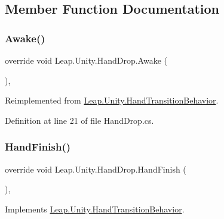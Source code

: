 \subsection{Member Function Documentation}
\mbox{\label{class_leap_1_1_unity_1_1_hand_drop_abda506fc6c05f924aa38e0011e26ffb9}} 
\subsubsection{\texorpdfstring{Awake()}{Awake()}}
{\footnotesize\ttfamily override void Leap.\+Unity.\+Hand\+Drop.\+Awake (\begin{DoxyParamCaption}{ }\end{DoxyParamCaption})\hspace{0.3cm}{\ttfamily [protected]}, {\ttfamily [virtual]}}



Reimplemented from \mbox{\hyperlink{class_leap_1_1_unity_1_1_hand_transition_behavior_ab9676a64c8b2ed72b1dd440c1f690c58}{Leap.\+Unity.\+Hand\+Transition\+Behavior}}.



Definition at line 21 of file Hand\+Drop.\+cs.

\mbox{\label{class_leap_1_1_unity_1_1_hand_drop_acecfd782c8bd61539dbbdd0bf1778f4b}} 
\subsubsection{\texorpdfstring{HandFinish()}{HandFinish()}}
{\footnotesize\ttfamily override void Leap.\+Unity.\+Hand\+Drop.\+Hand\+Finish (\begin{DoxyParamCaption}{ }\end{DoxyParamCaption})\hspace{0.3cm}{\ttfamily [protected]}, {\ttfamily [virtual]}}



Implements \mbox{\hyperlink{class_leap_1_1_unity_1_1_hand_transition_behavior_ab8668f229af94623ad378f456ae75326}{Leap.\+Unity.\+Hand\+Transition\+Behavior}}.



